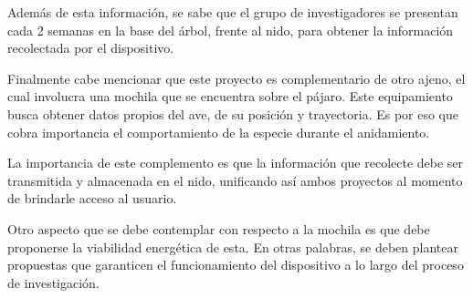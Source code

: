 Además de esta información, se sabe que el grupo de investigadores se presentan cada 2 semanas en la base del árbol, frente al nido, para obtener la información recolectada por el dispositivo.

Finalmente cabe mencionar que este proyecto es complementario de otro ajeno, el cual involucra una mochila que se encuentra sobre el pájaro. Este equipamiento busca obtener datos propios del ave, de su posición y trayectoria. Es por eso que cobra importancia el comportamiento de la especie durante el anidamiento.

La importancia de este complemento es que la información que recolecte debe ser transmitida y almacenada en el nido, unificando así ambos proyectos al momento de brindarle acceso al usuario. 

Otro aspecto que se debe contemplar con respecto a la mochila es que debe proponerse la viabilidad energética de esta. En otras palabras, se deben plantear propuestas que garanticen el funcionamiento del dispositivo a lo largo del proceso de investigación.

%